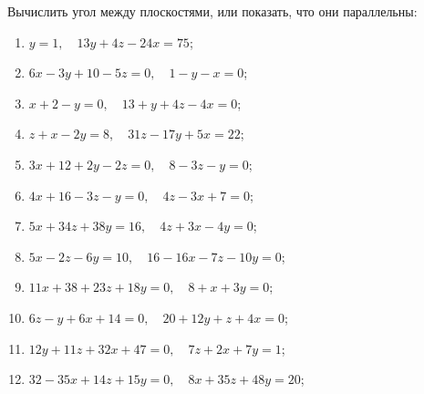 	\pagebreak
	Вычислить угол между плоскостями, или показать, что они параллельны:

	\begin{enumerate}
		\setcounter{enumi}{\value{tasks}}

			\item \( y = 1, \quad 13y+4z-24x = 75 \);
			\item \( 6x-3y+10-5z = 0, \quad 1-y-x = 0 \);
			\item \( x+2-y = 0, \quad 13+y+4z-4x = 0 \);
			\item \( z+x-2y = 8, \quad 31z-17y+5x = 22 \);
			\item \( 3x+12+2y-2z = 0, \quad 8-3z-y = 0 \);
			\item \( 4x+16-3z-y = 0, \quad 4z-3x+7 = 0 \);
			\item \( 5x+34z+38y = 16, \quad 4z+3x-4y = 0 \);
			\item \( 5x-2z-6y = 10, \quad 16-16x-7z-10y = 0 \);
			\item \( 11x+38+23z+18y = 0, \quad 8+x+3y = 0 \);
			\item \( 6z-y+6x+14 = 0, \quad 20+12y+z+4x = 0 \);
			\item \( 12y+11z+32x+47 = 0, \quad 7z+2x+7y = 1 \);
			\item \( 32-35x+14z+15y = 0, \quad 8x+35z+48y = 20 \);

		\setcounter{tasks}{\value{enumi}}
	\end{enumerate}

